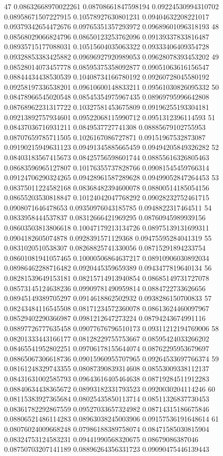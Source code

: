 47 0.08632668970022261 0.08708661847598194 0.09224530994310702 0.08958671507227915 0.10578927630801231 0.09404632208221017 0.09379342654472676 0.09765351357293972 0.09689601096318193
48 0.08568029066824796 0.08650123253762096 0.09139337833816487 0.08935715177088031 0.10515604035063322 0.09333406409354728 0.09328853383425882 0.09696927920989053 0.09628078393453202
49 0.08528014073457778 0.08595375358092877 0.09051063616156547 0.08844434438530539 0.10408734166780192 0.09260728045580192 0.09258197336538201 0.09610600148833211 0.09561030826095332
50 0.08478966545020548 0.08545354975967435 0.08969795996642808 0.08768962231317722 0.10327581453675809 0.09196255193304181 0.09213892757934601 0.09522068115990712 0.0951312396114593
51 0.08437036716931211 0.0849537727741308 0.08885679102755953 0.08707659785711505 0.1026167086727871 0.09151967532873087 0.09190215949631123 0.09491345885665459 0.09494205849326282
52 0.08403183567415673 0.08425756598601744 0.08855616326805463 0.08683596965127807 0.10176355737828766 0.09081545459766314 0.09124706290324265 0.09428961587289628 0.09499052847264453
53 0.08375011224582168 0.08368482394600078 0.08800514185054156 0.08655203530818847 0.10124042047768292 0.09028232752461715 0.0908071646478653 0.09350976043185785 0.0948822317464511
54 0.0833958444537837 0.08312666421969295 0.08760945989939156 0.08603503813806618 0.10047179213134726 0.08975139131699311 0.0904182605074878 0.0928391571129368 0.09475595284041319
55 0.0831020510538307 0.08268825741330056 0.08715291894233754 0.08601081941057465 0.10000506864637217 0.08910906030892034 0.08986462288716482 0.0920445359659389 0.0943477819640134
56 0.08281539649153181 0.08215714913940854 0.08685149731727078 0.08573145124638236 0.09909781490959814 0.0884722733626656 0.08945149389705297 0.0914618862502932 0.0938286150700833
57 0.08243484116545508 0.08171234572360078 0.08613624460097967 0.08529402290366987 0.0981212647273224 0.08794243674991116 0.08897726777635458 0.09077676796510173 0.09311212194769006
58 0.08201333443166177 0.08128229755753667 0.08595424033266202 0.08465541952802251 0.09706178155644074 0.08762295953679697 0.08865067306618736 0.09015960955707965 0.09264533697766374
59 0.08161248329743355 0.08087390839314608 0.08553009338112137 0.08431631002585793 0.09643616405464638 0.08719284511912283 0.08840634438365672 0.08993182331793523 0.0920030204114246
60 0.08115383927365684 0.08025435850113714 0.08511326837730453 0.08361782292867559 0.09527033657324982 0.08714315186675846 0.08806521486114283 0.08963038245003906 0.09157536191648614
61 0.08076024009668248 0.07986188389758074 0.08471585030815904 0.08324753124583231 0.09441990568320675 0.08679086387046 0.08750703207141189 0.08896264356331723 0.09090475446139443
